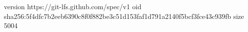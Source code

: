 version https://git-lfs.github.com/spec/v1
oid sha256:5f4dfc7b2eeb6390c8f0f882be3c51d153faf1d791a2140f5bcf3fce43c939fb
size 5004
